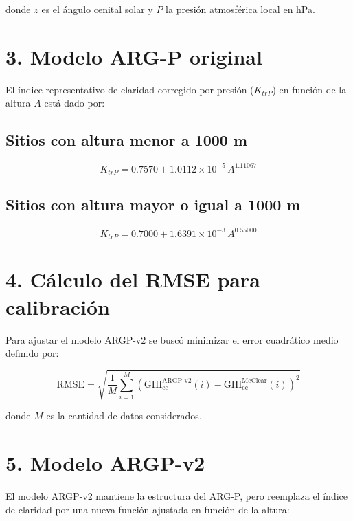 donde $z$ es el ángulo cenital solar y $P$ la presión atmosférica local en hPa.

\section*{3. Modelo ARG-P original}

El índice representativo de claridad corregido por presión ($K_{trP}$) en función de la altura $A$ 
está dado por:

\subsection*{Sitios con altura menor a 1000 m}

\begin{equation}
K_{trP} = 0.7570 + 1.0112 \times 10^{-5}\, A^{1.11067}
\label{eq:ktrp_low}
\end{equation}

\subsection*{Sitios con altura mayor o igual a 1000 m}

\begin{equation}
K_{trP} = 0.7000 + 1.6391 \times 10^{-3}\, A^{0.55000}
\label{eq:ktrp_high}
\end{equation}

\section*{4. Cálculo del RMSE para calibración}

Para ajustar el modelo ARGP-v2 se buscó minimizar el error cuadrático medio definido por:

\begin{equation}
\mathrm{RMSE} = 
\sqrt{
\frac{1}{M}
\sum_{i=1}^{M}
\left(
\mathrm{GHI_{cc}^{ARGP\_v2}}(i)
-
\mathrm{GHI_{cc}^{McClear}}(i)
\right)^2
}
\label{eq:rmse}
\end{equation}

donde $M$ es la cantidad de datos considerados.

\section*{5. Modelo ARGP-v2}

El modelo ARGP-v2 mantiene la estructura del ARG-P, pero reemplaza el índice de claridad por una 
nueva función ajustada en función de la altura:

